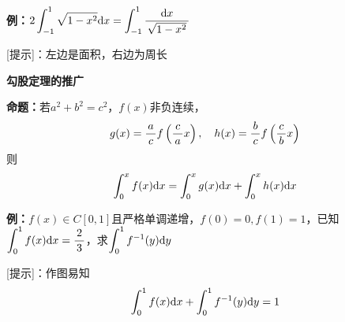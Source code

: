 {\bf 例：}$2\dint_{-1}^1\sqrt{1-x^2}\d x=
\dint_{-1}^1\df{\d x}{\sqrt{1-x^2}}$

[提示]：左边是面积，右边为周长

\begin{shaded}
	{\bf 勾股定理的推广}
	
	{\bf 命题：}若$a^2+b^2=c^2$，$f(x)$非负连续，
	$$g(x)=\df acf\left(\df cax\right),\quad 
	h(x)=\df bcf\left(\df cbx\right)$$
	则
	$$\dint_0^xf(x)\d x=\dint_0^xg(x)\d x+\dint_0^xh(x)\d x$$
	\begin{center}
	\end{center}
\end{shaded}

{\bf 例：}$f(x)\in C[0,1]$且严格单调递增，$f(0)=0,f(1)=1$，已知
$\dint_0^1f(x)\d x=\df23$，求$\dint_0^1f^{-1}(y)\d y$

[提示]：作图易知
$$\dint_0^1f(x)\d x+\dint_0^1f^{-1}(y)\d y=1$$

\begin{center}
\end{center}

